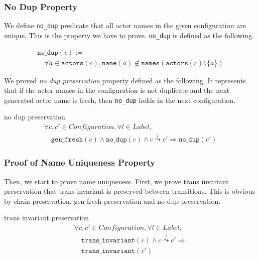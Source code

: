 \subsubsection{No Dup Property}
We define \texttt{no\_dup} predicate that all actor names in the given configuration are unique.
This is the property we have to prove.
\texttt{no\_dup} is defined as the following.

\begin{displaymath}
  \begin{array}{l}
    \texttt{no\_dup}(c) := \\
    \quad \forall a \in \texttt{actors}(c), \texttt{name}(a) \notin
    \texttt{names}(\texttt{actors}(c) \setminus \{a\})
  \end{array}
\end{displaymath}

We proved \textit{no dup preservation} property defined as the following.
It represents that if the actor names in the configuration is not duplicate and the next generated actor name is fresh, then \texttt{no\_dup} holds in the next configuration.

\begin{lemma}{no dup preservation}
\begin{displaymath}
  \begin{array}{l}
    \forall c, c' \in \textit{Configuration}, \forall l \in \textit{Label}, \\
    \quad \texttt{gen\_fresh}(c) \wedge \texttt{no\_dup}(c) \wedge c \overset{l}{\leadsto} c' \Rightarrow \texttt{no\_dup}(c')
  \end{array}
\end{displaymath}
\end{lemma}

\subsubsection{Proof of Name Uniqueness Property}
Then, we start to prove name uniqueness.
First, we prove trans invariant preservation that trans invariant is preserved between transitions.
This is obvious by chain preservation, gen fresh preservation and no dup preservation.
\begin{lemma}{trans invariant preservation}
  \begin{displaymath}
    \begin{array}{l}
      \forall c, c' \in \textit{Configuration}, \forall l \in \textit{Label}, \\
      \quad \texttt{trans\_invariant}(c) \wedge c \overset{l}{\leadsto} c' \Rightarrow \\
      \quad \texttt{trans\_invariant}(c')
    \end{array}
  \end{displaymath}
\end{lemma}

